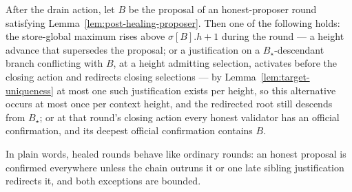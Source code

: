 \begin{corollary}
\label{cor:post-drain-confirms}
After the drain action, let \(B\) be the proposal of an honest-proposer
round satisfying Lemma~\ref{lem:post-healing-proposer}.  Then one of the
following holds: the
store-global maximum rises above \(\sigma[B].h+1\) during the round ---
a height advance that supersedes the proposal; or a justification on a
\(B_\star\)-descendant branch conflicting with \(B\), at a height
admitting selection, activates before the closing action and redirects
closing selections --- by Lemma~\ref{lem:target-uniqueness} at most one
such justification exists per height, so this alternative occurs at most
once per context height, and the redirected root still descends from
\(B_\star\); or at that
round's closing action every honest validator has an official
confirmation, and its deepest official confirmation contains \(B\).

In plain words, healed rounds behave like ordinary rounds: an honest
proposal is confirmed everywhere unless the chain outruns it or one
late sibling justification redirects it, and both exceptions are
bounded.
\end{corollary}


